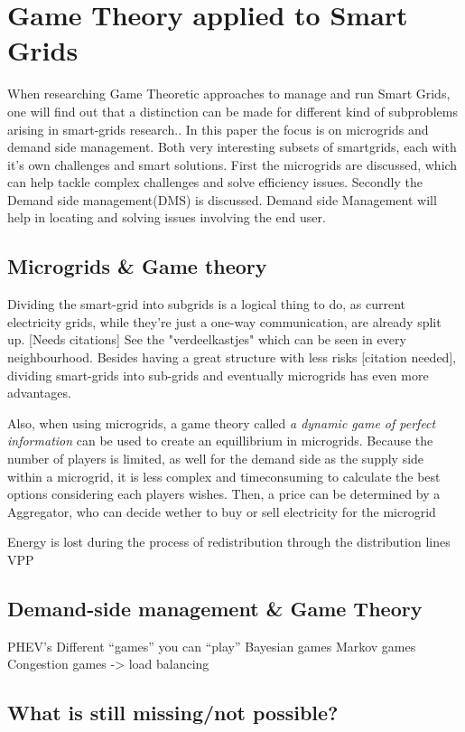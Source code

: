 \section{Game Theory applied to Smart Grids}
When researching Game Theoretic approaches to manage and run Smart Grids, one will find out that a distinction can be made for different kind of subproblems arising in smart-grids research.\cite{keypaper}. In this paper the focus is on microgrids and demand side management. Both very interesting subsets of smartgrids, each with it's own challenges and smart solutions. First the microgrids are discussed, which can help tackle complex challenges and solve efficiency issues. Secondly the Demand side management(DMS) is discussed. Demand side Management will help in locating and solving issues involving the end user. 


\subsection{Microgrids \& Game theory}
Dividing the smart-grid into subgrids is a logical thing to do, as current electricity grids, while they're just a one-way communication, are already split up. [Needs citations] See the "verdeelkastjes" which can be seen in every neighbourhood. Besides having a great structure with less risks [citation needed], dividing smart-grids into sub-grids and eventually microgrids %
has even more advantages. %


Also, when using microgrids, a game theory called \emph{a dynamic game of perfect information} %
 can be used to create an equillibrium in microgrids. Because the number of players is limited, as well for the demand side as the supply side within a microgrid, it is less complex and timeconsuming to calculate the best options considering each players wishes. Then, a price can be determined by a Aggregator, who can decide wether to buy or sell electricity for the microgrid \cite{MicrogridModellingPetrosAristidou}


Energy is lost during the process of redistribution through the distribution lines
VPP
\subsection{Demand-side management \& Game Theory}

PHEV’s
Different “games” you can “play”
Bayesian games
Markov games
Congestion games -> load balancing
\subsection{What is still missing/not possible?}
